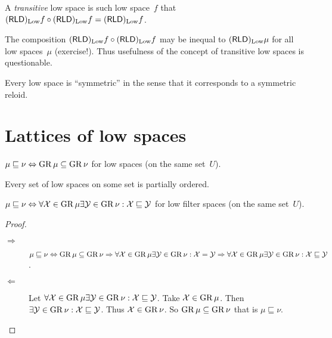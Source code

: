 \begin{defn}
A \emph{transitive} low space is such low space~$f$ that $(\mathsf{RLD})_{\operatorname{Low}}f\circ(\mathsf{RLD})_{\operatorname{Low}}f=(\mathsf{RLD})_{\operatorname{Low}}f$.
\end{defn}

\begin{rem}
The composition $(\mathsf{RLD})_{\operatorname{Low}}f\circ(\mathsf{RLD})_{\operatorname{Low}}f$ may be inequal to $(\mathsf{RLD})_{\operatorname{Low}}\mu$ for all low spaces~$\mu$ (exercise!).
Thus usefulness of the concept of transitive low spaces is questionable.
\end{rem}

\begin{rem}
Every low space is ``symmetric'' in the sense that it corresponds to a symmetric reloid.
\end{rem}

\section{Lattices of low spaces}

\begin{defn}
$\mu \sqsubseteq \nu \Leftrightarrow \operatorname{GR}\mu\subseteq\operatorname{GR}\nu$ for low spaces (on the same set~$U$).
\end{defn}

\begin{obvious}
Every set of low spaces on some set is partially ordered.
\end{obvious}

\begin{prop}\label{ls-order2}
$\mu \sqsubseteq \nu \Leftrightarrow \forall \mathcal{X}\in\operatorname{GR}\mu \exists\mathcal{Y}\in\operatorname{GR}\nu: \mathcal{X}\sqsubseteq\mathcal{Y}$ for
low filter spaces (on the same set~$U$).
\end{prop}

\begin{proof}
~
\begin{description}
\item[$\Rightarrow$] $\mu \sqsubseteq \nu \Leftrightarrow \operatorname{GR}\mu\subseteq\operatorname{GR}\nu \Rightarrow
  \forall \mathcal{X}\in\operatorname{GR}\mu \exists\mathcal{Y}\in\operatorname{GR}\nu: \mathcal{X}=\mathcal{Y} \Rightarrow
  \forall \mathcal{X}\in\operatorname{GR}\mu \exists\mathcal{Y}\in\operatorname{GR}\nu: \mathcal{X}\sqsubseteq\mathcal{Y}$.
\item[$\Leftarrow$] Let $\forall \mathcal{X}\in\operatorname{GR}\mu \exists\mathcal{Y}\in\operatorname{GR}\nu: \mathcal{X}\sqsubseteq\mathcal{Y}$.
  Take $\mathcal{X}\in\operatorname{GR}\mu$. Then $\exists\mathcal{Y}\in\operatorname{GR}\nu: \mathcal{X}\sqsubseteq\mathcal{Y}$. Thus $\mathcal{X}\in\operatorname{GR}\nu$.
  So $\operatorname{GR}\mu\subseteq\operatorname{GR}\nu$ that is $\mu \sqsubseteq \nu$.
\end{description}
\end{proof}

